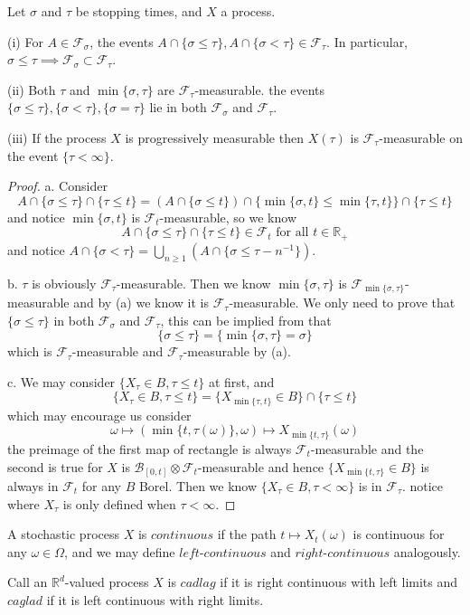 \documentclass[lang=en, color=blue, ]{elegantbook}
\newcommand{\F}{\mathcal{F}}
\newcommand{\R}{\mathbb{R}}
\newcommand{\B}{\mathcal{B}}
\begin{document}
\begin{lemma}
    Let $\sigma$ and $\tau$ be stopping times, and $X$ a process.\par
    (i) For $A\in\F_{\sigma}$, the events $A\cap\{\sigma\leq\tau\},A\cap\{\sigma<\tau\}\in \F_{\tau}$. In particular, $\sigma\leq \tau \implies \F_{\sigma}\subset \F_{\tau}$.\par
    (ii) Both $\tau$ and $\min\{\sigma,\tau\}$ are $\F_{\tau}$-measurable. the events $\{\sigma\leq \tau\},\{\sigma<\tau\},\{\sigma = \tau\}$ lie in both $\F_{\sigma}$ and $\F_{\tau}$.\par
    (iii) If the process $X$ is progressively measurable then $X(\tau)$ is $\F_{\tau}$-measurable on the event $\{\tau<\infty\}$.
\end{lemma}
\begin{proof}\par
a. Consider
\[ A\cap\{\sigma \leq \tau\}\cap\{\tau \leq t\} = (A\cap \{\sigma \leq t\}) \cap \{\min\{\sigma,t\}\leq\min\{\tau,t\}\}\cap \{\tau \leq t\}\]
and notice $\min\{\sigma,t\}$ is $\F_t$-measurable, so we know
\[A\cap\{\sigma \leq \tau\}\cap\{\tau \leq t\} \in \F_t\text{ for all }t\in\R_+\]
and notice $A\cap \{\sigma<\tau\} = \bigcup_{n\geq 1}(A\cap \{\sigma \leq \tau - n^{-1}\})$.\par
b. $\tau$ is obviously $\F_{\tau}$-measurable. Then we know $\min\{\sigma,\tau\}$ is $\F_{\min\{\sigma,\tau\}}$-measurable and by (a) we know it is $\F_{\tau}$-measurable. We only need to prove that $\{\sigma\leq\tau\}$ in both $\F_{\sigma}$ and $\F_{\tau}$, this can be implied from that
\[\{\sigma \leq \tau\} = \{\min\{\sigma,\tau\} = \sigma\}\]
which is $\F_{\tau}$-measurable and $\F_{\tau}$-measurable by (a).\par
c. We may consider $\{X_{\tau} \in B, \tau \leq t\}$ at first, and 
\[\{X_{\tau} \in B, \tau \leq t\} = \{X_{\min\{\tau,t\}}\in B\}\cap\{\tau\leq t\}\]
which may encourage us consider
\[ \omega \mapsto (\min\{t,\tau(\omega)\},\omega)\mapsto X_{\min\{t,\tau\}}(\omega)\]
the preimage of the first map of rectangle is always $\F_{t}$-measurable and the second is true for $X$ is $\B_{[0,t]}\otimes \F_t$-measurable and hence $\{X_{\min\{t,\tau\}}\in B\}$ is always in $\F_t$ for any $B$ Borel. Then we know $\{X_{\tau}\in B, \tau < \infty\}$ is in $\F_{\tau}$. notice where $X_{\tau}$ is only defined when $\tau < \infty$.
\end{proof}

\begin{definition}
    A stochastic process $X$ is $continuous$ if the path $t\mapsto X_t(\omega)$ is continuous for any $\omega\in\Omega$, and we may define $left$-$continuous$ and $right$-$continuous$ analogously.\par
    Call an $\R^d$-valued process $X$ is $cadlag$ if it is right continuous with left limits and $caglad$ if it is left continuous with right limits.
\end{definition}
\end{document}
